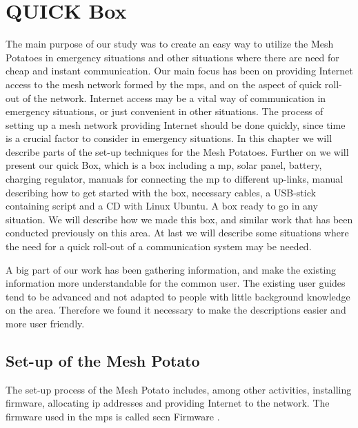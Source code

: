 \chapter{QUICK Box}
\label{chp:quickrollout} 

The main purpose of our study was to create an easy way to utilize the Mesh Potatoes in emergency situations and other situations where there are need for cheap and instant communication. Our main focus has been on providing Internet access to the mesh network formed by the \glspl{mp}, and on the aspect of quick roll-out of the network. Internet access may be a vital way of communication in emergency situations, or just convenient in other situations. The process of setting up a mesh network providing Internet should be done quickly, since time is a crucial factor to consider in emergency situations. In this chapter we will describe parts of the set-up techniques for the Mesh Potatoes. Further on we will present our \gls{quick} Box, which is a box including a \gls{mp}, solar panel, battery, charging regulator, manuals for connecting the \gls{mp} to different up-links, manual describing how to get started with the box, necessary cables, a USB-stick containing script and a CD with Linux Ubuntu. A box ready to go in any situation. We will describe how we made this box, and similar work that has been conducted previously on this area. At last we will describe some situations where the need for a quick roll-out of a communication system may be needed. 

A big part of our work has been gathering information, and make the existing information more understandable for the common user. The existing user guides tend to be advanced and not adapted to people with little background knowledge on the area. Therefore we found it necessary to make the descriptions easier and more user friendly. 

\section{Set-up of the Mesh Potato}
The set-up process of the Mesh Potato includes, among other activities, installing firmware, allocating \gls{ip} addresses and providing Internet to the network. The firmware used in the \glspl{mp} is called \gls{secn} Firmware \cite{ChoosingFirmware}. 

